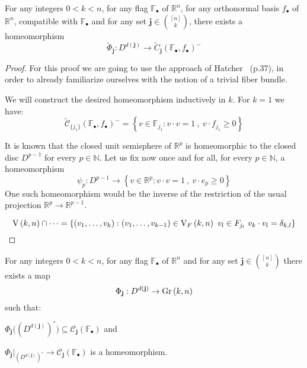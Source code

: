\begin{lemma}\label{lem:shub_dim} For any integers $0<k<n$, for any flag $\mathbb{F}_{\bullet}$ of $\mathbb{R}^n$, for any orthonormal basis $f_{\bullet}$ of $\mathbb{R}^n$, compatible with $\mathbb{F}_{\bullet}$ and for any set $\mathbf{j}\in\binom{[n]}{k}$, there exists a homeomorphism
\[\tilde{\Phi}_{\mathbf{j}}:D^{d(\mathbf{j})}\to\tilde{C}_{\mathbf{j}}{\left(\mathbb{F}_{\bullet},f_{\bullet}\right)}^-\]
\end{lemma}
\begin{proof} For this proof we are going to use the approach of Hatcher~\cite{vec_bundles} (p.37), in order to already familiarize ourselves with the notion of a trivial fiber bundle. 





\newpage





We will construct the desired homeomorphism inductively in $k$. For $k=1$ we have:
\[\tilde{\mathcal{C}}_{\{j_1\}}{\left(\mathbb{F}_{\bullet},f_{\bullet}\right)}^-=\left\{v\in\mathbb{F}_{j_1}:v\cdot v=1\ ,\ v\cdot f_{j_1}\geq0\right\}\]

It is known that the closed unit semisphere of $\mathbb{R}^p$ is homeomorphic to the closed disc $D^{p-1}$ for every $p\in\mathbb{N}$. Let us fix now once and for all, for every $p\in\mathbb{N}$, a homeomorphism
\[\psi_p:D^{p-1}\to\left\{v\in\mathbb{R}^p:v\cdot v=1\ ,\ v\cdot e_p\geq 0\right\}\]
One such homeomorphism would be the inverse of the restriction of the usual projection $\mathbb{R}^p\to\mathbb{R}^{p-1}$.

\[\St{k}{n}\cap\cdots=
\{(v_1,\ldots,v_k):(v_1,\ldots,v_{k-1})\in\St{k}{n}{F}\ v_l\in F_{j_l}\ v_k\cdot v_l=\delta_{k,l}\}\]



\end{proof}

\begin{lemma}\label{lem:dim_of_cells} For any integers $0<k<n$, for any flag $\mathbb{F}_{\bullet}$ of $\mathbb{R}^n$ and for any set $\mathbf{j}\in\binom{[n]}{k}$ there exists a map
\[\Phi_{\mathbf{j}}:D^{d(\mathbf{j})}\to\Gr{k}{n}\]
such that:
\begin{i_enum}
\item $\Phi_{\mathbf{j}}\big({\left(D^{d(\mathbf{j})}\right)}^{\circ}\big)\subseteq\mathcal{C}_{\mathbf{j}}(\mathbb{F}_{\bullet})$ and
\item $\Phi_{\mathbf{j}}|_{{\left(D^{d(\mathbf{j})}\right)}^{\circ}}\to\mathcal{C}_{\mathbf{j}}(\mathbb{F}_{\bullet})$ is a homeomorphism.
\end{i_enum}
\end{lemma}




